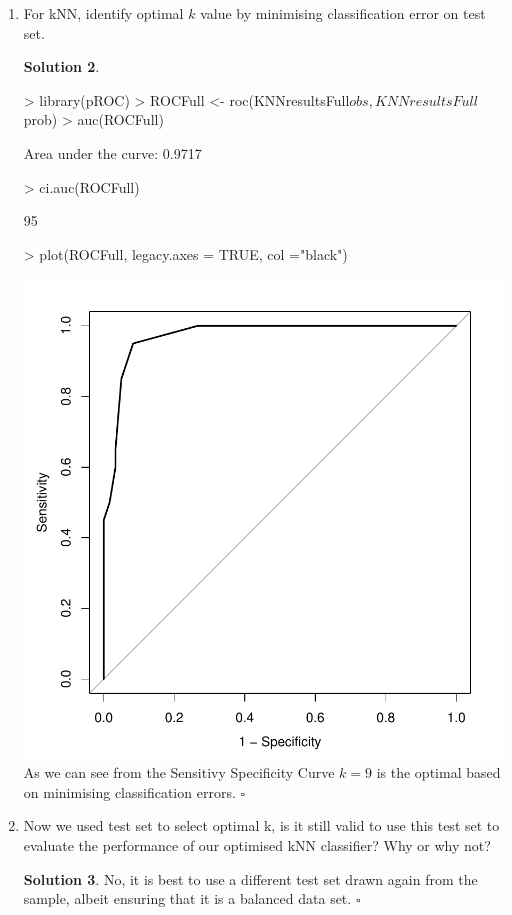 \documentclass[twoside]{article}
\theoremstyle{definition}
\newtheorem*{solutionT}{Solution}
\newenvironment{solution}{\begin{cBox}\begin{solutionT}}{\hfill{\scriptsize\ensuremath{\square}}\end{solutionT}\end{cBox}}
\theoremstyle{definition}
\begin{document}
\begin{enumerate}
\begin{solution}
   \end{solution}
   
   \item  For kNN, identify optimal $k$ value by minimising classification error on test set. 
    \begin{solution}
\begin{Schunk}
\begin{Sinput}
> library(pROC)
> ROCFull <- roc(KNNresultsFull$obs, KNNresultsFull$prob)
> auc(ROCFull)
\end{Sinput}
\begin{Soutput}
Area under the curve: 0.9717
\end{Soutput}
\begin{Sinput}
> ci.auc(ROCFull)
\end{Sinput}
\begin{Soutput}
95%
\end{Soutput}
\begin{Sinput}
> plot(ROCFull, legacy.axes = TRUE, col ="black")
\end{Sinput}
\end{Schunk}
\includegraphics{week5-011}
As we can see from the Sensitivy Specificity Curve $k=9$ is the optimal based on minimising classification errors.   
    \end{solution}
   \item Now we used test set to select optimal k, is it still valid to use this test set to evaluate
the performance of our optimised kNN classifier? Why or why not?
\begin{solution}
No, it is best to use a different test set drawn again from the sample, albeit ensuring that it is a balanced data set.
\end{solution}
    \end{enumerate}
\end{document}

